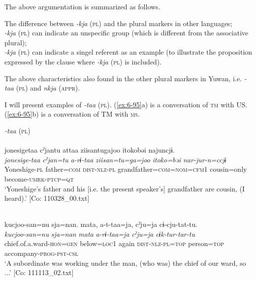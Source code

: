 The above argumentation is summarized as follows.

\ea\label{ex:6-94}
  The difference between \textit{-kja} (\textsc{pl}) and the plural markers in other languages;\\

 \ea \textit{-kja} (\textsc{pl}) can indicate an unspecific group (which is different from the associative plural);\\
\ex \textit{-kja} (\textsc{pl}) can indicate a singel referent as an example (to illustrate the proposition expressed by the clause where \textit{-kja} (\textsc{pl}) is included).\\

\z
\z

The above characteristics also found in the other plural markers in Yuwan, i.e. \textit{-taa} (\textsc{pl}) and \textit{nkja} (\textsc{appr}).

I will present examples of \textit{-taa} (\textsc{pl}). (\ref{ex:6-95}a) is a conversation of \textsc{tm} with US. (\ref{ex:6-95}b) is a conversation of TM with \textsc{ms}.

\ea\label{ex:6-95}
  \textit{-taa} (\textsc{pl})\\
 \ea{}\\
{\TM}
\glll  jonesigetaa  cˀjantu  attaa  ziisantugajoo    {\textbar}itoko{\textbar}bəi  najuncjɨ.\\
\textit{jonesige-taa}  \textit{cˀjan=tu}  \textit{a-rɨ-taa}  \textit{ziisan=tu=ga=joo}   \textit{itoko=bəi}  \textit{nar-jur-n=ccjɨ}\\
Yoneshige-\textsc{pl}  father=\textsc{com}  \textsc{dist}-\textsc{nlz}-\textsc{pl}  grandfather=\textsc{com}=\textsc{nom}=\textsc{cfm}1      cousin=only  become-\textsc{umrk}-\textsc{ptcp}=\textsc{qt}\\
\glt ‘Yoneshige’s father and his [i.e. the present speaker’s] grandfather are cousin, (I heard).’ [Co: 110328\_00.txt]

\ex{}\\
{\TM}
\glll  kucjoo-san=nu  sja=nan.  mata,  a-t-taa=ja,     cˀju=ja  cɨ-cju-tat-tu.\\
\textit{kucjoo-san=nu}  \textit{sja=nan}  \textit{mata}  \textit{a-rɨ-taa=ja}     \textit{cˀju=ja}  \textit{cɨk-tur-tar-tu}\\
chief.of.a.ward-\textsc{hon}=\textsc{gen}  below=\textsc{loc1}  again  \textsc{dist}-\textsc{nlz}-\textsc{pl}=\textsc{top} person=\textsc{top}  accompany-\textsc{prog}-\textsc{pst}-\textsc{csl}\\
\glt ‘A subordinate was working under the man, (who was) the chief of our ward, so ...’ [Co: 111113\_02.txt]
\z
\z

